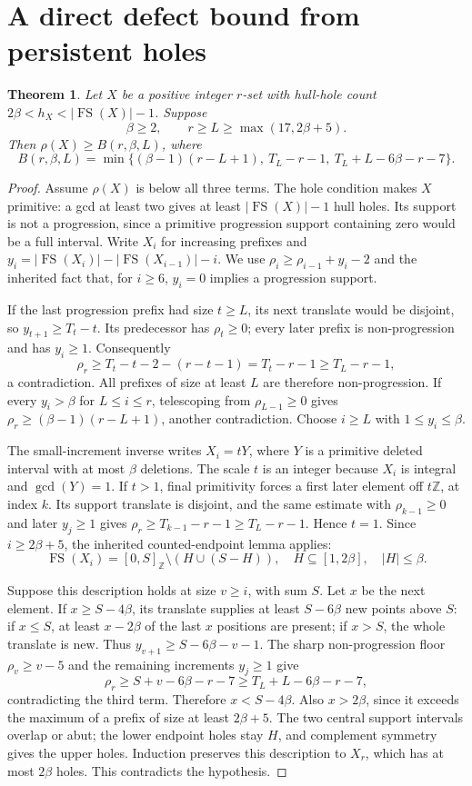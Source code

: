 \documentclass[11pt,a4paper]{article}
\newcommand{\FS}{\operatorname{FS}}
\newcommand{\Z}{\mathbb Z}
\newtheorem{theorem}{Theorem}[section]
\begin{document}
\section{A direct defect bound from persistent holes}
\begin{theorem}\label{holerho}
Let $X$ be a positive integer $r$-set with hull-hole count
$2\beta<h_X<|\FS(X)|-1$. Suppose
\[
 \beta\ge2,\qquad r\ge L\ge\max(17,2\beta+5).
\]
Then $\rho(X)\ge B(r,\beta,L)$, where
\begin{equation}\label{holerhofloor}
 B(r,\beta,L)=\min\{(\beta-1)(r-L+1),\ T_L-r-1,
                   \ T_L+L-6\beta-r-7\}.
\end{equation}
\end{theorem}
\begin{proof}
Assume $\rho(X)$ is below all three terms. The hole condition makes $X$
primitive: a gcd at least two gives at least $|\FS(X)|-1$ hull holes.
Its support is not a progression, since a primitive progression support
containing zero would be a full interval.
Write $X_i$ for increasing prefixes and
$y_i=|\FS(X_i)|-|\FS(X_{i-1})|-i$. We use
$\rho_i\ge\rho_{i-1}+y_i-2$ and the inherited fact that, for $i\ge6$,
$y_i=0$ implies a progression support.

If the last progression prefix had size $t\ge L$, its next translate
would be disjoint, so $y_{t+1}\ge T_t-t$. Its predecessor has
$\rho_t\ge0$; every later prefix is non-progression and has $y_i\ge1$.
Consequently
\[
 \rho_r\ge T_t-t-2-(r-t-1)=T_t-r-1\ge T_L-r-1,
\]
a contradiction. All prefixes of size at least $L$ are therefore
non-progression. If every $y_i>\beta$ for $L\le i\le r$, telescoping
from $\rho_{L-1}\ge0$ gives
$\rho_r\ge(\beta-1)(r-L+1)$, another contradiction.
Choose $i\ge L$ with $1\le y_i\le\beta$.

The small-increment inverse writes $X_i=tY$, where $Y$ is a primitive
deleted interval with at most $\beta$ deletions. The scale $t$ is an
integer because $X_i$ is integral and $\gcd(Y)=1$.
If $t>1$, final primitivity forces a first later element off $t\Z$,
at index $k$. Its support translate is disjoint, and the same estimate
with $\rho_{k-1}\ge0$ and later $y_j\ge1$ gives
$\rho_r\ge T_{k-1}-r-1\ge T_L-r-1$. Hence $t=1$.
Since $i\ge2\beta+5$, the inherited counted-endpoint lemma applies:
\[
 \FS(X_i)=[0,S]_{\Z}\setminus(H\cup(S-H)),\quad
 H\subseteq[1,2\beta],\quad |H|\le\beta.
\]

Suppose this description holds at size $v\ge i$, with sum $S$.
Let $x$ be the next element. If $x\ge S-4\beta$, its translate supplies
at least $S-6\beta$ new points above $S$: if $x\le S$, at least
$x-2\beta$ of the last $x$ positions are present; if $x>S$, the whole
translate is new. Thus
$y_{v+1}\ge S-6\beta-v-1$. The sharp non-progression floor
$\rho_v\ge v-5$ and the remaining increments $y_j\ge1$ give
\[
 \rho_r\ge S+v-6\beta-r-7
 \ge T_L+L-6\beta-r-7,
\]
contradicting the third term. Therefore $x<S-4\beta$.
Also $x>2\beta$, since it exceeds the maximum of a prefix of size
at least $2\beta+5$. The two central support intervals overlap or abut;
the lower endpoint holes stay $H$, and complement symmetry gives the
upper holes. Induction preserves this description to $X_r$, which has
at most $2\beta$ holes. This contradicts the hypothesis.
\end{proof}
\end{document}
